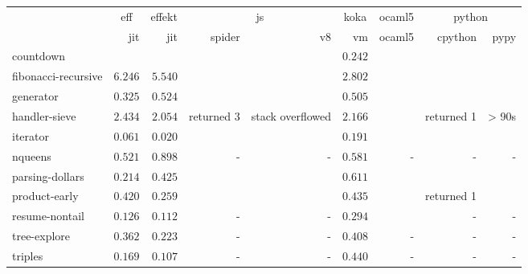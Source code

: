 \begin{tabular}{l r r r r r r r r}
\toprule & \multicolumn{1}{c}{eff} & \multicolumn{1}{c}{effekt} & \multicolumn{2}{c}{js} & \multicolumn{1}{c}{koka} & \multicolumn{1}{c}{ocaml5} & \multicolumn{2}{c}{python} \\
\cmidrule(l){2-2}\cmidrule(l){3-3}\cmidrule(l){4-5}\cmidrule(l){6-6}\cmidrule(l){7-7}\cmidrule(l){8-9} 
 & jit & jit & spider & v8 & vm & ocaml5 & cpython & pypy \\
\midrule
countdown &  &  &  &  & $\mathbf{0.242}$ &  &  &  \\
fibonacci-recursive & $6.246$ & $5.540$ &  &  & $\mathbf{2.802}$ &  &  &  \\
generator & $\mathbf{0.325}$ & $0.524$ &  &  & $0.505$ &  &  &  \\
handler-sieve & $2.434$ & $\mathbf{2.054}$ & returned 3 & stack overflowed & $2.166$ &  & returned 1 & > 90s \\
iterator & $0.061$ & $\mathbf{0.020}$ &  &  & $0.191$ &  &  &  \\
nqueens & $\mathbf{0.521}$ & $0.898$ & - & - & $0.581$ & - & - & - \\
parsing-dollars & $\mathbf{0.214}$ & $0.425$ &  &  & $0.611$ &  &  &  \\
product-early & $0.420$ & $\mathbf{0.259}$ &  &  & $0.435$ &  & returned 1 &  \\
resume-nontail & $0.126$ & $\mathbf{0.112}$ & - & - & $0.294$ &  & - & - \\
tree-explore & $0.362$ & $\mathbf{0.223}$ & - & - & $0.408$ & - & - & - \\
triples & $0.169$ & $\mathbf{0.107}$ & - & - & $0.440$ & - & - & - \\
\bottomrule
\end{tabular}